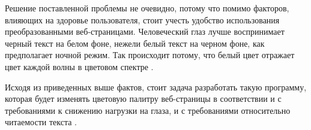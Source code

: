 Решение поставленной проблемы не очевидно, потому что помимо факторов, влияющих на здоровье пользователя, стоит учесть удобство использования преобразованными веб-страницами. Человеческий глаз лучше воспринимает черный текст на белом фоне, нежели белый текст на черном фоне, как предполагает ночной режим. Так происходит потому, что белый цвет отражает цвет каждой волны в цветовом спектре \cite{whitecolor}.

Исходя из приведенных выше фактов, стоит задача разработать такую программу, которая будет изменять цветовую палитру веб-страницы в соответствии и с требованиями к снижению нагрузки на глаза, и с требованиями относительно читаемости текста \cite{wcag}.